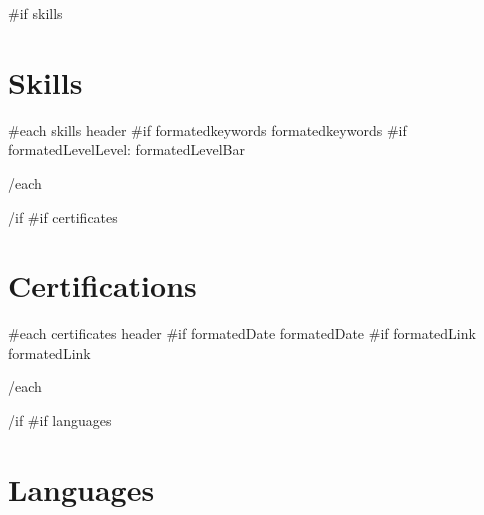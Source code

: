 \documentclass{article}
\begin{document}
\color{primary-950}

\begin{paracol}{2}
\begin{leftcolumn*}
\titleformat{\section}{\color{accent}\raggedright\normalsize\bfseries\uppercase}{}{0ex}{}
\titlespacing{\section}{0ex}{0.75ex}{0.75ex}
{{#if skills}}\section*{Skills}{
  {{#each skills}}
    {{ header }}\newline
    {{#if formatedkeywords}}{{ formatedkeywords }}
    {{#if formatedLevel}}Level: {{ formatedLevelBar }}
    \par
  {{/each}}
}{{/if}}
{{#if certificates}}\section*{Certifications}{
  {{#each certificates}}
    {{ header }}\newline
    {{#if formatedDate}}{{ formatedDate }}
    {{#if formatedLink}}{{ formatedLink }}
    \par
  {{/each}}
}{{/if}}
{{#if languages}}\section*{Languages}{
}
\end{leftcolumn*}
\end{paracol}
\end{document}
